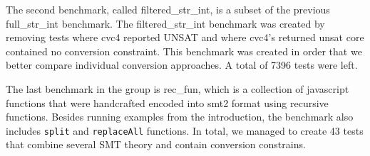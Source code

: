 The second benchmark, called filtered\_str\_int, is a subset of the previous full\_str\_int benchmark. The filtered\_str\_int benchmark was created by removing tests where cvc4 reported UNSAT and where cvc4's returned unsat core contained no conversion constraint. This benchmark was created in order that we better compare individual conversion approaches. A total of 7396 tests were left.

The last benchmark in the group is rec\_fun, which is a collection of javascript functions that were handcrafted encoded into smt2 format using recursive functions. Besides running examples from the introduction, the benchmark also includes \texttt{split} and \texttt{replaceAll} functions. In total, we managed to create 43 tests that combine several SMT theory and contain conversion constrains.



